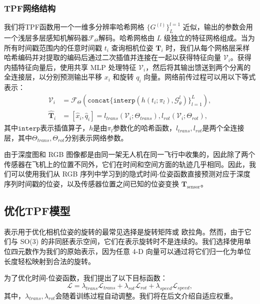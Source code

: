 \subsubsection{TPF网络结构}

我们将TPF函数用一个一维多分辨率哈希网格 $\{G^{(l)}\}_L^{l=1}$ 近似，输出的参数会用一个浅层多层感知机解码器$\mathcal{F}_\Theta$解码。哈希网格由 $L$ 级独立的特征网格组成。当为所有时间戳范围内的任意时间戳 $t_i$ 查询相机位姿 $\mathbf{T}_i$ 时，我们从每个网格层采样哈希编码并对提取的编码后通过二次插值并连接在一起以获得特征向量 $\mathcal{V}_i$。获得内插特征向量后，使用共享 MLP 处理特征 $\mathcal{V}_i$，然后将其输出馈送到两个分离的全连接层，以分别预测输出平移 $x_i$ 和旋转 $q_i$ 向量。网络前传过程可以用以下等式表示：
\begin{align}
    \mathcal{V}_i&=\mathcal{F}_\Theta(\mathtt{concat}\{\mathtt{interp}(h(t_i;\pi_l), \mathcal{G}_\theta^l)\}^L_{l=1}),\\
    \hat{\mathbf{T}}_i &= [\hat{x}_i, \hat{q}_i] = l_{trans}(\mathcal{V}_i; \Theta_{trans}), l_{rot}(\mathcal{V}_i; \Theta_{rot}),
\end{align}
其中$\mathtt{interp}$表示插值算子，$h$是由$π_l$参数化的哈希函数，$l_{trans},l_{rot}$是两个全连接层，其中$\Theta_{trans},\Theta_{rot}$分别表示网络参数。

由于深度图和 RGB 图像都是由同一架无人机在同一飞行中收集的，因此除了两个传感器在飞机上的位置不同外，它们在时间和空间方面的轨迹几乎相同。因此，我们可以使用我们从 RGB 序列中学习到的隐式时间-位姿函数直接预测对应于深度序列时间戳的位姿，以及传感器位置之间已知的位姿变换 $\mathbf{T}_\text{sensor}$。


\subsection{优化TPF模型}
表示用于优化相机位姿的旋转的最常见选择是旋转矩阵\cite{yen-chen_inerf_2021}或 欧拉角。然而，由于它们与 SO(3) 的非同胚表示空间，它们在表示旋转时不是连续的\cite{kendall_posenet_2015}。我们选择使用单位四元数作为我们的原始表示，因为任意 4-D 向量可以通过将它们归一化为单位长度轻松映射到合法的旋转。

为了优化时间-位姿函数，我们提出了以下目标函数：
\begin{equation}
    \mathcal{L} = \lambda_{trans}\mathcal{L}_{trans}+\lambda_{rot}\mathcal{L}_{rot}+\lambda_{speed}\mathcal{L}_{speed},
\end{equation}
其中，$\lambda_{trans}, \lambda_{rot}$会随着训练过程自动调整。我们将在后文介绍自适应权重。

